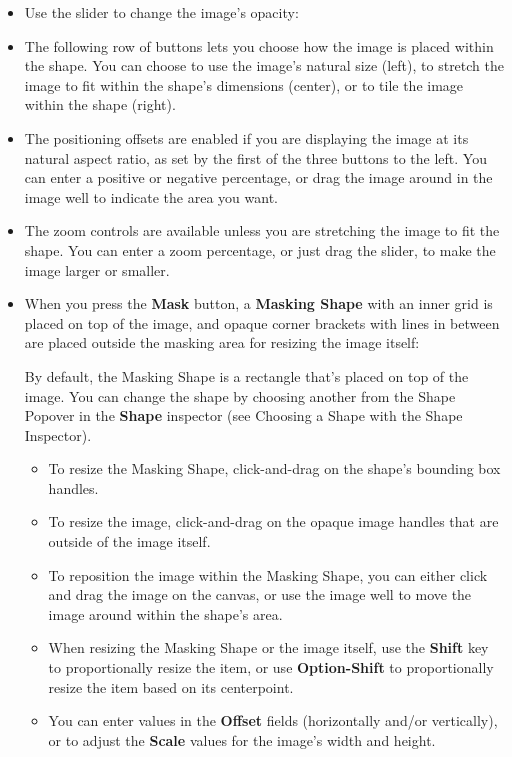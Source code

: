 \documentclass[../main.tex]{subfiles}
\begin{document}
\begin{itemize}
  \item Use the slider to change the image's opacity:

  \item The following row of buttons lets you choose how the image is placed within the shape.
    You can choose to use the image's natural size (left), to stretch the image to fit within
    the shape's dimensions (center), or to tile the image within the shape (right).

  \item The positioning offsets are enabled if you are displaying the image at its natural
    aspect ratio, as set by the first of the three buttons to the left. You can enter a positive
    or negative percentage, or drag the image around in the image well to indicate the area you
    want.
  \item The zoom controls are available unless you are stretching the image to fit the shape.
    You can enter a zoom percentage, or just drag the slider, to make the image larger or
    smaller.

  \item When you press the \textbf{Mask} button, a \textbf{Masking Shape} with an inner grid is
    placed on top of the image, and opaque corner brackets with lines in between are placed
    outside the masking area for resizing the image itself:


    By default, the Masking Shape is a rectangle that's placed on top of the image. You can change
    the shape by choosing another from the Shape Popover in the \textbf{Shape} inspector (see
    Choosing a Shape with the Shape Inspector).

    \begin{itemize}
      \item To resize the Masking Shape, click-and-drag on the shape's bounding box handles.
      \item To resize the image, click-and-drag on the opaque image handles that are outside of
        the image itself.
      \item To reposition the image within the Masking Shape, you can either click and drag the
        image on the canvas, or use the image well to move the image around within the shape's
        area.
      \item When resizing the Masking Shape or the image itself, use the \textbf{Shift} key to
        proportionally resize the item, or use \textbf{Option-Shift} to proportionally resize the
        item based on its centerpoint.
      \item You can enter values in the \textbf{Offset} fields (horizontally and/or vertically),
        or to adjust the \textbf{Scale} values for the image's width and height.
    \end{itemize}


\end{itemize}
\end{document}
